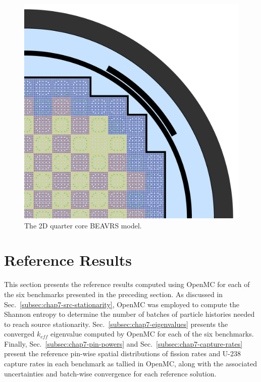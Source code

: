 \begin{figure}[h!]
  \centering
  \includegraphics[width=0.9\linewidth]{figures/benchmarks/quarter-core}
\vspace{2mm}
\caption[The 2D quarter core \ac{BEAVRS} model]{The 2D quarter core \ac{BEAVRS} model.}
\label{fig:chap7-full-core}
\end{figure}


\section{Reference Results}
\label{sec:chap7-ref-results}

This section presents the reference results computed using OpenMC for each of the six benchmarks presented in the preceding section. As discussed in Sec.~\ref{subsec:chap7-src-stationarity}, OpenMC was employed to compute the Shannon entropy to determine the number of batches of particle histories needed to reach source stationarity. Sec.~\ref{subsec:chap7-eigenvalues} presents the converged $k_{eff}$ eigenvalue computed by OpenMC for each of the six benchmarks. Finally, Sec.~\ref{subsec:chap7-pin-powers} and Sec.~\ref{subsec:chap7-capture-rates} present the reference pin-wise spatial distributions of fission rates and U-238 capture rates in each benchmark as tallied in OpenMC, along with the associated uncertainties and batch-wise convergence for each reference solution.

